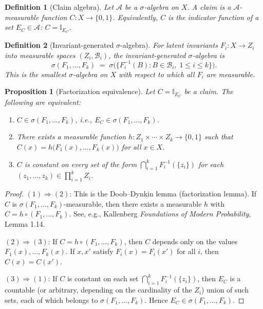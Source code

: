 \documentclass[11pt]{article}
\newtheorem{definition}{Definition}
\newtheorem{proposition}{Proposition}
\begin{document}
\begin{definition}[Claim algebra]
Let $\mathcal{A}$ be a $\sigma$-algebra on $X$. A \emph{claim} is a $\mathcal{A}$-measurable function $C\colon X\to\{0,1\}$. Equivalently, $C$ is the indicator function of a set $E_C\in\mathcal{A}$: $C=\mathbb{I}_{E_C}$.
\end{definition}

\begin{definition}[Invariant-generated $\sigma$-algebra]
For latent invariants $F_i\colon X\to Z_i$ into measurable spaces $(Z_i,\mathcal{B}_i)$, the \emph{invariant-generated $\sigma$-algebra} is
\[
\sigma(F_1,\ldots,F_k)\;=\;\sigma\!\bigl(\{F_i^{-1}(B):B\in\mathcal{B}_i,\;1\leq i\leq k\}\bigr).
\]
This is the smallest $\sigma$-algebra on $X$ with respect to which all $F_i$ are measurable.
\end{definition}

\begin{proposition}[Factorization equivalence]\label{prop:factorization}
Let $C=\mathbb{I}_{E_C}$ be a claim. The following are equivalent:
\begin{enumerate}
\item $C\in\sigma(F_1,\ldots,F_k)$, i.e., $E_C\in\sigma(F_1,\ldots,F_k)$.
\item There exists a measurable function $h\colon Z_1\times\cdots\times Z_k\to\{0,1\}$ such that $C(x)=h\bigl(F_1(x),\ldots,F_k(x)\bigr)$ for all $x\in X$.
\item $C$ is constant on every set of the form $\bigcap_{i=1}^k F_i^{-1}(\{z_i\})$ for each $(z_1,\ldots,z_k)\in\prod_{i=1}^k Z_i$.
\end{enumerate}
\end{proposition}

\begin{proof}
$(1)\Rightarrow(2)$: This is the Doob--Dynkin lemma (factorization lemma). If $C$ is $\sigma(F_1,\ldots,F_k)$-measurable, then there exists a measurable $h$ with $C=h\circ(F_1,\ldots,F_k)$. See, e.g., Kallenberg \emph{Foundations of Modern Probability}, Lemma 1.14.

$(2)\Rightarrow(3)$: If $C=h\circ(F_1,\ldots,F_k)$, then $C$ depends only on the values $F_1(x),\ldots,F_k(x)$. If $x,x'$ satisfy $F_i(x)=F_i(x')$ for all $i$, then $C(x)=C(x')$.

$(3)\Rightarrow(1)$: If $C$ is constant on each set $\bigcap_{i=1}^k F_i^{-1}(\{z_i\})$, then $E_C$ is a countable (or arbitrary, depending on the cardinality of the $Z_i$) union of such sets, each of which belongs to $\sigma(F_1,\ldots,F_k)$. Hence $E_C\in\sigma(F_1,\ldots,F_k)$.
\end{proof}
\end{document}
